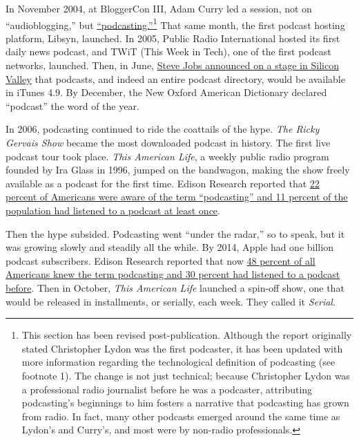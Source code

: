 \documentclass[notoc, symmetric, nobib, nols]{towcenter-guideto-book}
\begin{document}
In November 2004, at BloggerCon III, Adam Curry led a session, not on ``audioblogging,'' but \href{http://web.archive.org/web/20130729212422id_/http://itc.conversationsnetwork.org/shows/detail275.html}{``podcasting.''}\autocite{Solutions}\footnote{This section has been revised post-publication. Although the report originally stated Christopher Lydon was the first podcaster, it has been updated with more information regarding the technological definition of podcasting (see footnote 1). The change is not just technical; because Christopher Lydon was a professional radio journalist before he was a podcaster, attributing podcasting's beginnings to him fosters a narrative that podcasting has grown from radio. In fact, many other podcasts emerged around the same time as Lydon's and Curry's, and most were by non-radio professionals.\autocite{WINER}} That same month, the first podcast hosting platform, Libsyn, launched. In 2005, Public Radio International hosted its first daily news podcast, and TWiT (This Week in Tech), one of the first podcast networks, launched. Then, in June, \href{https://www.youtube.com/watch?v=K0KNLCbzZUw}{Steve Jobs announced on a stage in Silicon Valley} that podcasts, and indeed an entire podcast directory, would be available in iTunes 4.9.\autocite{JobsVideo} By December, the New Oxford American Dictionary declared ``podcast'' the word of the year.\autocite{PCHistoryWiki}

In 2006, podcasting continued to ride the coattails of the hype. \textit{The Ricky Gervais Show} became the most downloaded podcast in history. The first live podcast tour took place.\autocite{PCHistoryWiki} \textit{This American Life}, a weekly public radio program founded by Ira Glass in 1996, jumped on the bandwagon, making the show freely available as a podcast for the first time. Edison Research reported that \href{http://www.edisonresearch.com/the-podcast-consumer-2015/}{22 percent of Americans were aware of the term ``podcasting'' and 11 percent of the population had listened to a podcast at least once}.\autocite{EdPCconsumer}

Then the hype subsided. Podcasting went ``under the radar,'' so to speak, but it was growing slowly and steadily all the while. By 2014, Apple had one billion podcast subscribers. Edison Research reported that now \href{http://www.edisonresearch.com/the-podcast-consumer-2015/}{48 percent of all Americans knew the term podcasting and 30 percent had listened to a podcast before}.\autocite{EdPCconsumer} Then in October, \textit{This American Life} launched a spin-off show, one that would be released in installments, or serially, each week. They called it \textit{Serial}. 
\end{document}
